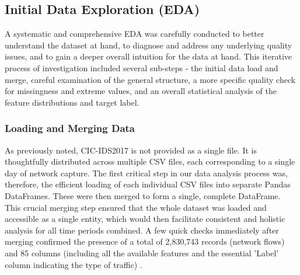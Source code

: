 \subsection{Initial Data Exploration (EDA)} 
A systematic and comprehensive EDA was carefully conducted to better understand the dataset at hand, to diagnose and address any underlying quality issues, and to gain a deeper overall intuition for the data at hand. This iterative process of investigation included several sub-steps - the initial data load and merge, careful examination of the general structure, a more specific quality check for missingness and extreme values, and an overall statistical analysis of the feature distributions and target label.

\subsubsection{Loading and Merging Data} 
As previously noted, CIC-IDS2017 is not provided as a single file. It is thoughtfully distributed across multiple CSV files, each corresponding to a single day of network capture. The first critical step in our data analysis process was, therefore, the efficient loading of each individual CSV files into separate Pandas DataFrames. These were then merged to form a single, complete DataFrame. This crucial merging step ensured that the whole dataset was loaded and accessible as a single entity, which would then facilitate consistent and holistic analysis for all time periods combined. A few quick checks immediately after merging confirmed the presence of a total of 2,830,743 records (network flows) and 85 columns (including all the available features and the essential 'Label' column indicating the type of traffic) \parencite{al2022cicids}.

